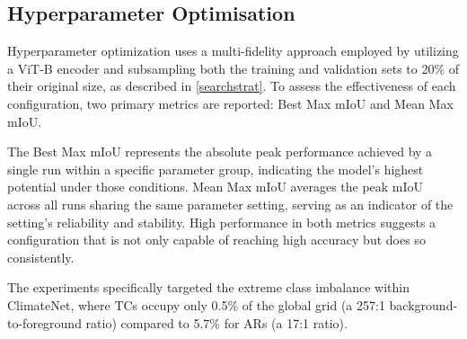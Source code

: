 
\subsection{Hyperparameter Optimisation}

Hyperparameter optimization uses a multi-fidelity approach employed by utilizing a ViT-B encoder and subsampling both the training and validation sets to 20\% of their original size, as described in \autoref{searchstrat}. To assess the effectiveness of each configuration, two primary metrics are reported: Best Max mIoU and Mean Max mIoU. 

The Best Max mIoU represents the absolute peak performance achieved by a single run within a specific parameter group, indicating the model's highest potential under those conditions. Mean Max mIoU averages the peak mIoU across all runs sharing the same parameter setting, serving as an indicator of the setting's reliability and stability. High performance in both metrics suggests a configuration that is not only capable of reaching high accuracy but does so consistently.

The experiments specifically targeted the extreme class imbalance within ClimateNet, where TCs occupy only 0.5\% of the global grid (a 257:1 background-to-foreground ratio) compared to 5.7\% for ARs (a 17:1 ratio).




